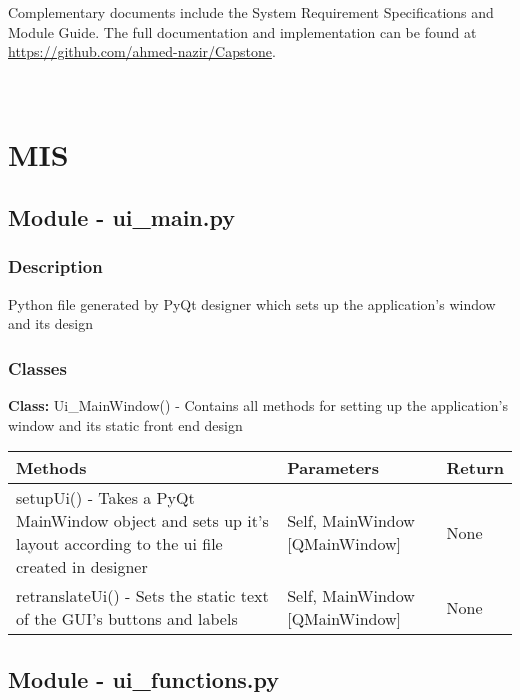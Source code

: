 \documentclass[12pt, titlepage]{article}
\begin{document}
Complementary documents include the System Requirement Specifications
and Module Guide.  The full documentation and implementation can be
found at \url{https://github.com/ahmed-nazir/Capstone}.  


~\newpage

\section{MIS } \label{Module} 



  \subsection{Module - ui\_main.py}

  \subsubsection{Description}
  Python file generated by PyQt designer which sets up the application’s window and its design

  \subsubsection{Classes}
  \textbf{Class:} Ui\_MainWindow() - Contains all methods for setting up the application’s window and its static front end design \\

    \noindent \begin{tabular}{| p{} | p{}| p{}|}
      \hline
      \rowcolor[gray]{0.9}
      Methods & Parameters & Return\\
      \hline
      setupUi() - Takes a PyQt MainWindow object and sets up it’s layout according to the ui file created in designer &Self, MainWindow [QMainWindow] & None \\
      \hline
      retranslateUi() - Sets the static text of the GUI’s buttons and labels & Self, MainWindow [QMainWindow] & None \\
      \hline
    \end{tabular}

    \subsection{Module - ui\_functions.py}
\end{document}
